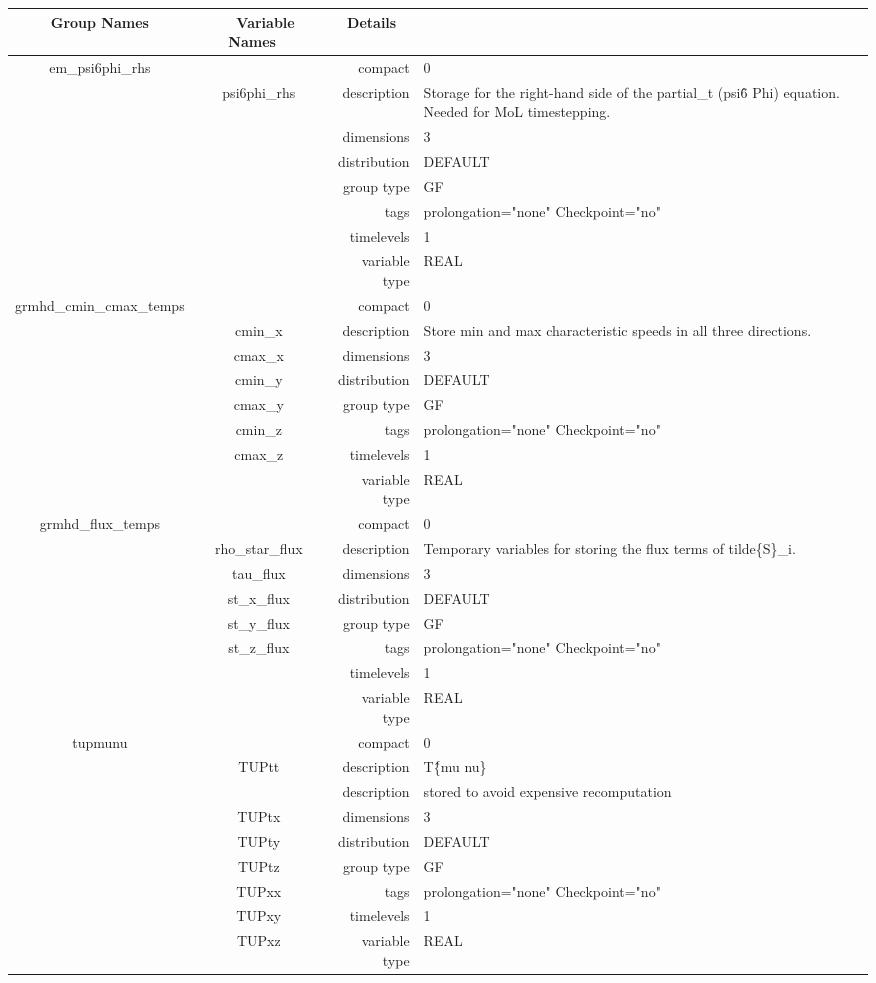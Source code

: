 \documentclass{article}
\begin{document}
\vspace{5mm}
\vspace{5mm}

\begin{tabular*}{150mm}{|c|c@{\extracolsep{\fill}}|rl|} \hline 
~ {\bf Group Names} ~ & ~ {\bf Variable Names} ~  &{\bf Details} ~ & ~ \\ 
\hline 
em\_psi6phi\_rhs &  & compact & 0 \\ 
 & psi6phi\_rhs & description & Storage for the right-hand side of the partial\_t (psi\^6 Phi) equation. Needed for MoL timestepping. \\ 
 &  & dimensions & 3 \\ 
 &  & distribution & DEFAULT \\ 
 &  & group type & GF \\ 
 &  & tags & prolongation="none" Checkpoint="no" \\ 
 &  & timelevels & 1 \\ 
 &  & variable type & REAL \\ 
\hline 
grmhd\_cmin\_cmax\_temps &  & compact & 0 \\ 
 & cmin\_x & description & Store min and max characteristic speeds in all three directions. \\ 
 & cmax\_x & dimensions & 3 \\ 
 & cmin\_y & distribution & DEFAULT \\ 
 & cmax\_y & group type & GF \\ 
 & cmin\_z & tags & prolongation="none" Checkpoint="no" \\ 
 & cmax\_z & timelevels & 1 \\ 
 &  & variable type & REAL \\ 
\hline 
grmhd\_flux\_temps &  & compact & 0 \\ 
 & rho\_star\_flux & description & Temporary variables for storing the flux terms of tilde\{S\}\_i. \\ 
 & tau\_flux & dimensions & 3 \\ 
 & st\_x\_flux & distribution & DEFAULT \\ 
 & st\_y\_flux & group type & GF \\ 
 & st\_z\_flux & tags & prolongation="none" Checkpoint="no" \\ 
 &  & timelevels & 1 \\ 
 &  & variable type & REAL \\ 
\hline 
tupmunu &  & compact & 0 \\ 
 & TUPtt & description & T\^\{mu nu\} \\ 
& ~ & description &  stored to avoid expensive recomputation \\ 
 & TUPtx & dimensions & 3 \\ 
 & TUPty & distribution & DEFAULT \\ 
 & TUPtz & group type & GF \\ 
 & TUPxx & tags & prolongation="none" Checkpoint="no" \\ 
 & TUPxy & timelevels & 1 \\ 
 & TUPxz & variable type & REAL \\ 
\hline 
\end{tabular*} 
\end{document}
